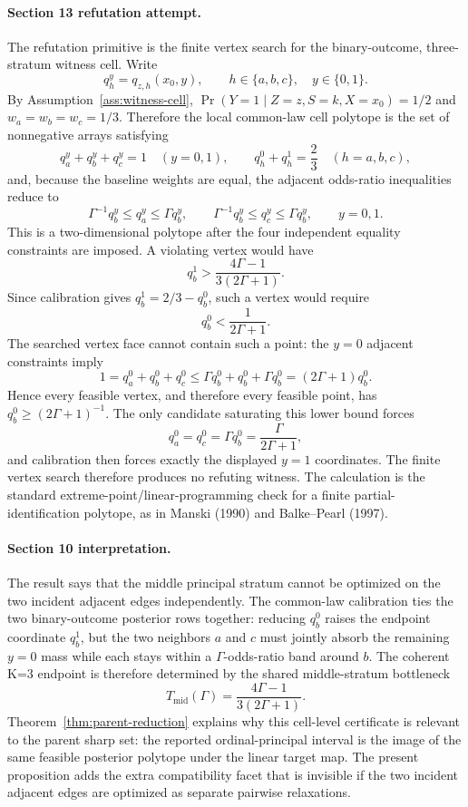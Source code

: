 \paragraph{Section 13 refutation attempt.}
The refutation primitive is the finite vertex search for the binary-outcome, three-stratum witness cell.  Write
\[
  q_h^y=q_{z,h}(x_0,y),\qquad h\in\{a,b,c\},\quad y\in\{0,1\}.
\]
By Assumption~\ref{ass:witness-cell}, \(\Pr(Y=1\mid Z=z,S=k,X=x_0)=1/2\) and \(w_a=w_b=w_c=1/3\).  Therefore the local common-law cell polytope is the set of nonnegative arrays satisfying
\[
  q_a^y+q_b^y+q_c^y=1\quad (y=0,1),
  \qquad
  q_h^0+q_h^1=\frac23\quad (h=a,b,c),
\]
and, because the baseline weights are equal, the adjacent odds-ratio inequalities reduce to
\[
  \Gamma^{-1}q_b^y\le q_a^y\le \Gamma q_b^y,\qquad
  \Gamma^{-1}q_b^y\le q_c^y\le \Gamma q_b^y,
  \qquad y=0,1.
\]
This is a two-dimensional polytope after the four independent equality constraints are imposed.  A violating vertex would have
\[
  q_b^1>\frac{4\Gamma-1}{3(2\Gamma+1)}.
\]
Since calibration gives \(q_b^1=2/3-q_b^0\), such a vertex would require
\[
  q_b^0<\frac{1}{2\Gamma+1}.
\]
The searched vertex face cannot contain such a point: the \(y=0\) adjacent constraints imply
\[
  1=q_a^0+q_b^0+q_c^0
  \le \Gamma q_b^0+q_b^0+\Gamma q_b^0
  =(2\Gamma+1)q_b^0.
\]
Hence every feasible vertex, and therefore every feasible point, has \(q_b^0\ge (2\Gamma+1)^{-1}\).  The only candidate saturating this lower bound forces
\[
  q_a^0=q_c^0=\Gamma q_b^0=\frac{\Gamma}{2\Gamma+1},
\]
and calibration then forces exactly the displayed \(y=1\) coordinates.  The finite vertex search therefore produces no refuting witness.  The calculation is the standard extreme-point/linear-programming check for a finite partial-identification polytope, as in Manski (1990) and Balke--Pearl (1997).

\paragraph{Section 10 interpretation.}
The result says that the middle principal stratum cannot be optimized on the two incident adjacent edges independently.  The common-law calibration ties the two binary-outcome posterior rows together: reducing \(q_b^0\) raises the endpoint coordinate \(q_b^1\), but the two neighbors \(a\) and \(c\) must jointly absorb the remaining \(y=0\) mass while each stays within a \(\Gamma\)-odds-ratio band around \(b\).  The coherent K=3 endpoint is therefore determined by the shared middle-stratum bottleneck
\[
  T_{\mathrm{mid}}(\Gamma)=\frac{4\Gamma-1}{3(2\Gamma+1)}.
\]
Theorem~\ref{thm:parent-reduction} explains why this cell-level certificate is relevant to the parent sharp set: the reported ordinal-principal interval is the image of the same feasible posterior polytope under the linear target map.  The present proposition adds the extra compatibility facet that is invisible if the two incident adjacent edges are optimized as separate pairwise relaxations.

